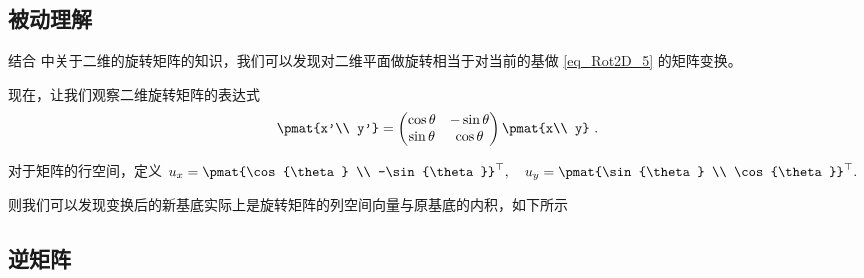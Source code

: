\subsection{被动理解}

结合  中关于二维的旋转矩阵的知识，我们可以发现对二维平面做旋转相当于对当前的基做 \autoref{eq_Rot2D_5} 的矩阵变换。

现在，让我们观察二维旋转矩阵的表达式
\begin{equation}
\pmat{x'\\ y'} =
\begin{pmatrix}
\cos\theta & - \sin\theta\\
\sin\theta &\cos\theta
\end{pmatrix}\pmat{x\\ y}~.
\end{equation}

对于矩阵的行空间，定义 $u_{x}=\pmat{\cos{\theta} \\ -\sin{\theta}}^{\top} ,\quad u_{y}=\pmat{\sin{\theta} \\ \cos{\theta}}^{\top}.$

则我们可以发现变换后的新基底实际上是旋转矩阵的列空间向量与原基底的内积，如下所示
\begin{equation}

\end{equation}





\subsection{逆矩阵}

